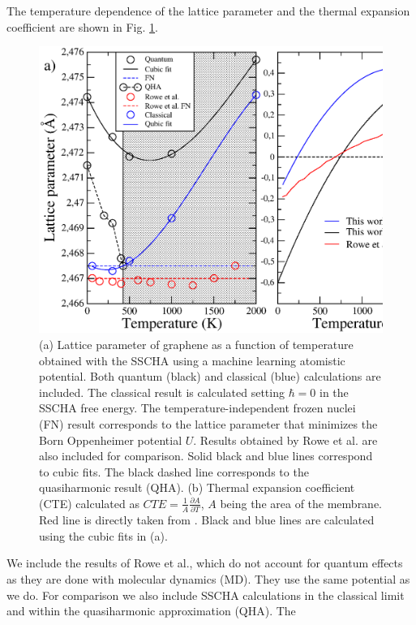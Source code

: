 The temperature dependence 
of the lattice parameter and the thermal expansion coefficient are shown in Fig. \ref{lattice}.
\begin{figure}[ht]
\includegraphics[width=0.99\linewidth]{Figures/lattice.eps}
	\caption[Lattice parameter of graphene as a function of temperature]{(a) Lattice parameter of graphene as a 
	function of temperature obtained with the SSCHA using a machine learning atomistic potential. Both quantum 
	(black) and classical (blue) calculations are included. The classical result is calculated setting $\hbar=0$ 
	in the SSCHA free energy. The temperature-independent frozen nuclei (FN) result corresponds to the lattice 
	parameter that minimizes the Born Oppenheimer potential $U$. Results obtained by Rowe et 
	al.\cite{rowe2018development} are also included for comparison. Solid black and blue lines correspond to 
	cubic fits. The black dashed line corresponds to the quasiharmonic result (QHA). (b) Thermal expansion 
	coefficient (CTE) calculated as $CTE=\frac{1}{A}\frac{\partial A}{\partial T}$, $A$ being the area of the 
	membrane. Red line is directly taken from \cite{rowe2018development}. Black and blue lines are calculated 
	using the cubic fits in (a).}
\label{lattice}
\end{figure}
We include the results of Rowe et al.\cite{rowe2018development}, which do not account for quantum effects as they 
are done with molecular dynamics (MD). They use the same potential as we do. For comparison we also include SSCHA 
calculations in the classical limit and within the quasiharmonic approximation\cite{bonini2007phonon} (QHA). The 
